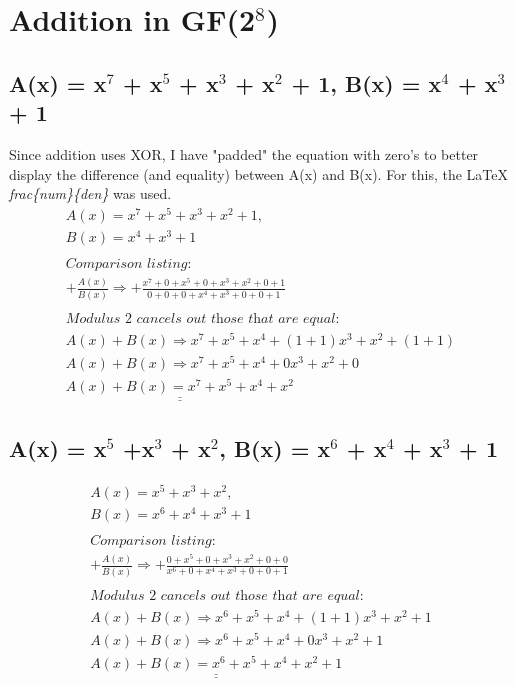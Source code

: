 \section{Addition in GF(2$^{8}$)}


\subsection{A(x) = x$^{7}$ + x$^{5}$ + x$^{3}$ + x$^{2}$ + 1, B(x) = x$^{4}$ + x$^{3}$ + 1}
\label{section:1a}
Since addition uses XOR, I have "padded" the equation with zero's to better display the difference (and equality) between A(x) and B(x).
For this, the \LaTeX \textit{\\frac\{num\}\{den\}} was used.
\begin{equation}
\begin{split}
A(x) = x^{7} + x^{5} + x^{3} + x^{2} + 1, \\
B(x) = x^{4} + x^{3} + 1 \\
~ \\
\textit{Comparison listing:} \\
+ \frac{A(x)}{B(x)} \Rightarrow + \frac{x^{7} + 0 + x^{5} + 0 + x^{3} + x^{2} + 0 + 1}{0 + 0 + 0 + x^{4} + x^{3} + 0 + 0 + 1} \\
~ \\
\textit{Modulus 2 cancels out those that are equal:} \\
A (x) + B(x) \Rightarrow x^{7} + x^{5} + x^{4} + (1 + 1) x^{3} + x^{2} + (1 + 1) \\
A (x) + B(x) \Rightarrow x^{7} + x^{5} + x^{4} + 0x^{3} + x^{2} + 0 \\
\underline{\underline{A (x) + B(x) = x^{7} + x^{5} + x^{4} + x^{2}}}
\end{split}
\end{equation}

\subsection{A(x) = x$^{5}$ +x$^{3}$ + x$^{2}$, B(x) = x$^{6}$ + x$^{4}$ + x$^{3}$ + 1}
\label{section:1b}
\begin{equation}
\begin{split}
A(x) = x^{5} + x^{3} + x^{2}, \\
B(x) = x^{6} + x^{4} + x^{3} + 1  \\
~ \\
\textit{Comparison listing:} \\
+ \frac{A(x)}{B(x)} \Rightarrow + \frac{0 + x^{5} + 0 + x^{3} + x^{2} + 0 + 0}{x^{6} + 0 + x^{4} + x^{3} +0 + 0 + 1} \\
~ \\
\textit{Modulus 2 cancels out those that are equal:} \\
A (x) + B(x) \Rightarrow x^{6} + x^{5} + x^{4} + (1 + 1)x^{3} + x^{2} + 1 \\
A (x) + B(x) \Rightarrow x^{6} + x^{5} + x^{4} + 0x^{3} + x^{2} + 1 \\
\underline{\underline{A (x) + B(x) = x^{6} + x^{5} + x^{4} + x^{2} + 1}}
\end{split}
\end{equation}

